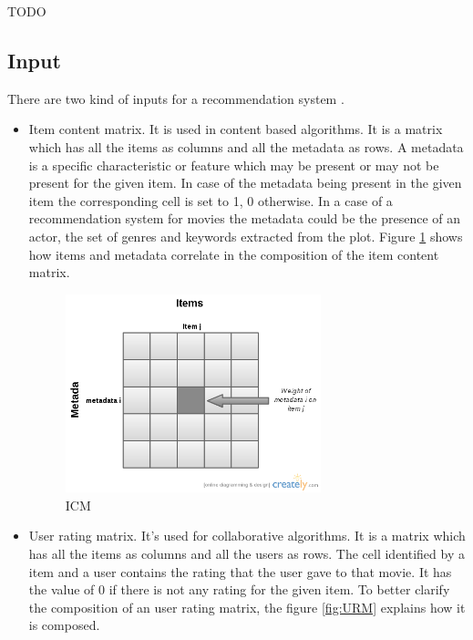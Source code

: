 TODO

\subsection{Input}
\label{sec:Input}

There are two kind of inputs for a recommendation system \cite{thesis-andreia}. 
\begin{itemize}
\item Item content matrix. It is used in content based algorithms. It is a matrix which has all the items as columns and all the metadata as rows. A metadata is a specific characteristic or feature which may be present or may not be present for the given item. In case of the metadata being present in the given item the corresponding cell is set to 1, 0 otherwise. In a case of a recommendation system for movies the metadata could be the presence of an actor, the set of genres and keywords extracted from the plot. Figure \ref{fig:ICM} shows how items and metadata correlate in the composition of the item content matrix.

  \begin{figure}
    \centering
    \includegraphics[width=0.7\textwidth]{figures/ICM.png}
    \caption{ICM}
    \label{fig:ICM}
  \end{figure}
 
\item User rating matrix. It's used for collaborative algorithms. It is a matrix which has all the items as columns and all the users as rows. The cell identified by a item and a user contains the rating that the user gave to that movie. It has the value of 0 if there is not any rating for the given item. To better clarify the composition of an user rating matrix, the figure \ref{fig:URM} explains how it is composed.


\end{itemize}
